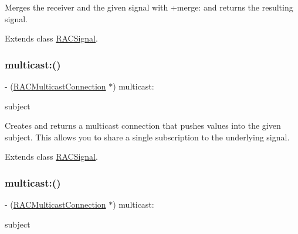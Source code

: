 Merges the receiver and the given signal with {\ttfamily +merge\+:} and returns the resulting signal. 

Extends class \mbox{\hyperlink{interface_r_a_c_signal_aeda66daaf146a2d218ba7819297628a9}{R\+A\+C\+Signal}}.

\mbox{\label{category_r_a_c_signal_07_operations_08_a55b43f4fbef7e430a4587ce13eab18cb}} 
\subsubsection{\texorpdfstring{multicast\+:()}{multicast:()}\hspace{0.1cm}{\footnotesize\ttfamily [1/3]}}
{\footnotesize\ttfamily -\/ (\mbox{\hyperlink{interface_r_a_c_multicast_connection}{R\+A\+C\+Multicast\+Connection}} $\ast$) multicast\+: \begin{DoxyParamCaption}\item[{(\mbox{\hyperlink{interface_r_a_c_subject}{R\+A\+C\+Subject}} $\ast$)}]{subject }\end{DoxyParamCaption}}

Creates and returns a multicast connection that pushes values into the given subject. This allows you to share a single subscription to the underlying signal. 

Extends class \mbox{\hyperlink{interface_r_a_c_signal_a55b43f4fbef7e430a4587ce13eab18cb}{R\+A\+C\+Signal}}.

\mbox{\label{category_r_a_c_signal_07_operations_08_a55b43f4fbef7e430a4587ce13eab18cb}} 
\subsubsection{\texorpdfstring{multicast\+:()}{multicast:()}\hspace{0.1cm}{\footnotesize\ttfamily [2/3]}}
{\footnotesize\ttfamily -\/ (\mbox{\hyperlink{interface_r_a_c_multicast_connection}{R\+A\+C\+Multicast\+Connection}} $\ast$) multicast\+: \begin{DoxyParamCaption}\item[{(\mbox{\hyperlink{interface_r_a_c_subject}{R\+A\+C\+Subject}} $\ast$)}]{subject }\end{DoxyParamCaption}}

